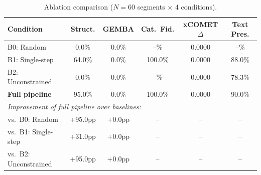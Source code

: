 \begin{table}[t]
  \centering
  \caption{Ablation comparison ($N{=}60$ segments $\times$ 4 conditions).}
  \label{tab:ablation}
  \small
  \begin{tabular}{l c c c c c}
    \toprule
    \textbf{Condition} & \textbf{Struct.} & \textbf{GEMBA} & \textbf{Cat.\ Fid.} & \textbf{xCOMET $\Delta$} & \textbf{Text Pres.} \\
    \midrule
    B0: Random & 0.0\% & 0.0\% & --\% & 0.0000 & --\% \\
    B1: Single-step & 64.0\% & 0.0\% & 100.0\% & 0.0000 & 88.0\% \\
    B2: Unconstrained & 0.0\% & 0.0\% & --\% & 0.0000 & 78.3\% \\
    \textbf{Full pipeline} & 95.0\% & 0.0\% & 100.0\% & 0.0000 & 90.0\% \\
    \midrule
    \multicolumn{6}{l}{\textit{Improvement of full pipeline over baselines:}} \\
    vs.\ B0: Random & +95.0pp & +0.0pp & -- & -- & -- \\
    vs.\ B1: Single-step & +31.0pp & +0.0pp & -- & -- & -- \\
    vs.\ B2: Unconstrained & +95.0pp & +0.0pp & -- & -- & -- \\
    \bottomrule
  \end{tabular}
\end{table}